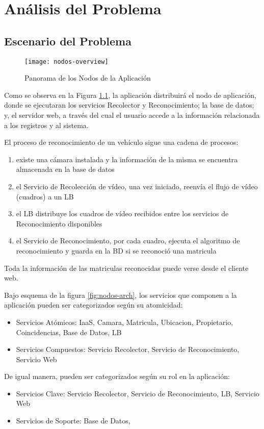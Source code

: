 \chapter{Análisis del Problema}
    \section{Escenario del Problema}
    \begin{figure}[H]
            \centering
            \texttt{[image: nodos-overview]}
            \caption{Panorama de los Nodos de la Aplicación}
            \label{fig:nodos-overview}
    \end{figure}
    
    Como se observa en la Figura \ref{fig:nodos-overview}, la aplicación distribuirá el nodo de aplicación, donde se ejecutaran los servicios Recolector y Reconocimiento; la base de datos; y, el servidor web, a través del cual el usuario accede a la información relacionada a los registros y al sistema.
        
        El proceso de reconocimiento de un vehículo sigue una cadena de procesos:

        \begin{enumerate}
            \item existe una cámara instalada y la información de la misma se encuentra almacenada en la base de datos
            \item el Servicio de Recolección de vídeo, una vez iniciado, reenvía el flujo de vídeo (cuadros) a un LB
            \item el LB distribuye los cuadros de vídeo recibidos entre los servicios de Reconocimiento disponibles
            \item el Servicio de Reconocimiento, por cada cuadro, ejecuta el algoritmo de reconocimiento y guarda en la BD si se reconoció una matricula
        \end{enumerate}    
        
        Toda la información de las matriculas reconocidas puede verse desde el cliente web.
        
        Bajo esquema de la figura \ref{fig:nodos-arch}, los servicios que componen a la aplicación pueden ser categorizados según su atomicidad:
        \begin{itemize}
            \item Servicios Atómicos: IaaS, Camara, Matricula, Ubicacion, Propietario, Coincidencias, Base de Datos, LB
            \item Servicios Compuestos: Servicio Recolector, Servicio de Reconocimiento, Servicio Web
        \end{itemize}
        De igual manera, pueden ser categorizados según su rol en la aplicación:
        \begin{itemize}
            \item Servicios Clave: Servicio Recolector, Servicio de Reconocimiento, LB, Servicio Web
            \item Servicios de Soporte: Base de Datos,
        \end{itemize}
    
